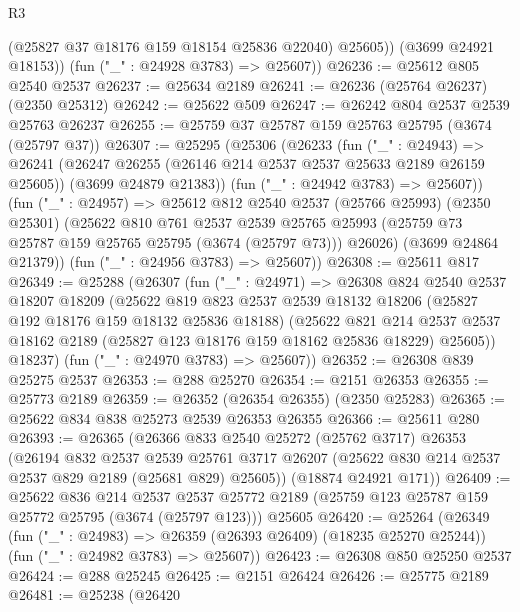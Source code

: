 \begin{lexlean}{R3}
\begin{coremodule}
            (@25827 @37 @18176 @159 @18154 @25836 @22040)
            @25605))
        (@3699 @24921 @18153))
      (fun ("_" : @24928 @3783) => @25607))
@26236 := @25612 @805 @2540 @2537
@26237 := @25634 @2189
@26241 := @26236 (@25764 @26237) (@2350 @25312)
@26242 := @25622 @509
@26247 := @26242 @804 @2537 @2539 @25763 @26237
@26255 := @25759 @37 @25787 @159 @25763 @25795 (@3674 (@25797 @37))
@26307 := @25295
    (@25306
      (@26233
        (fun ("_" : @24943) =>
        @26241
          (@26247 @26255 (@26146 @214 @2537 @2537 @25633 @2189 @26159 @25605))
          (@3699 @24879 @21383))
        (fun ("_" : @24942 @3783) => @25607))
      (fun ("_" : @24957) =>
      @25612
        @812
        @2540
        @2537
        (@25766 @25993)
        (@2350 @25301)
        (@25622
          @810
          @761
          @2537
          @2539
          @25765
          @25993
          (@25759 @73 @25787 @159 @25765 @25795 (@3674 (@25797 @73)))
          @26026)
        (@3699 @24864 @21379))
      (fun ("_" : @24956 @3783) => @25607))
@26308 := @25611 @817
@26349 := @25288
    (@26307
      (fun ("_" : @24971) =>
      @26308
        @824
        @2540
        @2537
        @18207
        @18209
        (@25622
          @819
          @823
          @2537
          @2539
          @18132
          @18206
          (@25827 @192 @18176 @159 @18132 @25836 @18188)
          (@25622
            @821
            @214
            @2537
            @2537
            @18162
            @2189
            (@25827 @123 @18176 @159 @18162 @25836 @18229)
            @25605))
        @18237)
      (fun ("_" : @24970 @3783) => @25607))
@26352 := @26308 @839 @25275 @2537
@26353 := @288 @25270
@26354 := @2151 @26353
@26355 := @25773 @2189
@26359 := @26352 (@26354 @26355) (@2350 @25283)
@26365 := @25622 @834 @838 @25273 @2539 @26353 @26355
@26366 := @25611 @280
@26393 := @26365
    (@26366
      @833
      @2540
      @25272
      (@25762 @3717)
      @26353
      (@26194
        @832
        @2537
        @2539
        @25761
        @3717
        @26207
        (@25622 @830 @214 @2537 @2537 @829 @2189 (@25681 @829) @25605))
      (@18874 @24921 @171))
@26409 := @25622
    @836
    @214
    @2537
    @2537
    @25772
    @2189
    (@25759 @123 @25787 @159 @25772 @25795 (@3674 (@25797 @123)))
    @25605
@26420 := @25264
    (@26349
      (fun ("_" : @24983) => @26359 (@26393 @26409) (@18235 @25270 @25244))
      (fun ("_" : @24982 @3783) => @25607))
@26423 := @26308 @850 @25250 @2537
@26424 := @288 @25245
@26425 := @2151 @26424
@26426 := @25775 @2189
@26481 := @25238
    (@26420

\end{coremodule}
\end{lexlean}
